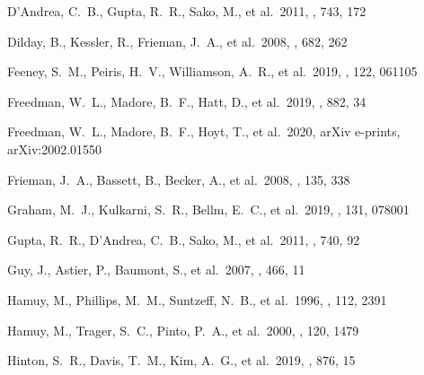 \documentclass[]{aa} %
\begin{document}
\begin{thebibliography}{}



 D'Andrea, C.~B., Gupta, R.~R.,
Sako, M., et al.\ 2011, \apj, 743, 172

 Dilday, B., Kessler, R., Frieman,
J.~A., et al.\ 2008, \apj, 682, 262


 Feeney, S.~M., Peiris, H.~V.,
Williamson, A.~R., et al.\ 2019, \prl, 122, 061105

 Freedman, W.~L., Madore, B.~F.,
Hatt, D., et al.\ 2019, \apj, 882, 34

 Freedman, W.~L., Madore, B.~F.,
Hoyt, T., et al.\ 2020, arXiv e-prints, arXiv:2002.01550

 Frieman, J.~A., Bassett, B., Becker,
A., et al.\ 2008, \aj, 135, 338


 Graham, M.~J., Kulkarni, S.~R., Bellm,
E.~C., et al.\ 2019, \pasp, 131, 078001

 Gupta, R.~R., D'Andrea, C.~B., Sako, M.,
et al.\ 2011, \apj, 740, 92

 Guy, J., Astier, P., Baumont, S., et al.\
2007, \aap, 466, 11




 Hamuy, M., Phillips, M.~M., Suntzeff,
N.~B., et al.\ 1996, \aj, 112, 2391

 Hamuy, M., Trager, S.~C., Pinto, P.~A.,
et al.\ 2000, \aj, 120, 1479

 Hinton, S.~R., Davis, T.~M., Kim,
A.~G., et al.\ 2019, \apj, 876, 15


\end{thebibliography}
\end{document}
